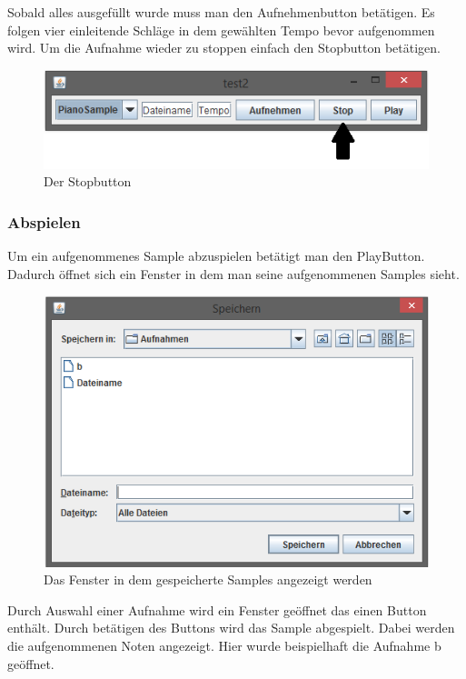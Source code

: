 Sobald alles ausgefüllt wurde muss man den Aufnehmenbutton betätigen. Es folgen vier einleitende Schläge in dem gewählten Tempo bevor aufgenommen wird. Um die Aufnahme wieder zu stoppen einfach den Stopbutton betätigen.

\begin{figure}[hbtp]
\centering
\includegraphics[scale=1]{Bilder/Projektbild4_Stop.PNG}
\caption{Der Stopbutton}
\end{figure}

\newpage


\subsubsection{Abspielen}

Um ein aufgenommenes Sample abzuspielen betätigt man den PlayButton. Dadurch öffnet sich ein Fenster in dem man seine aufgenommenen Samples sieht.

\begin{figure}[hbtp]
\centering
\includegraphics[scale=0.8]{Bilder/AbspielenBild.PNG}
\caption{Das Fenster in dem gespeicherte Samples angezeigt werden}
\end{figure}


Durch Auswahl einer Aufnahme wird ein Fenster geöffnet das einen Button enthält. Durch betätigen des Buttons wird das Sample abgespielt. Dabei werden die aufgenommenen Noten angezeigt. Hier wurde beispielhaft die Aufnahme b geöffnet.

